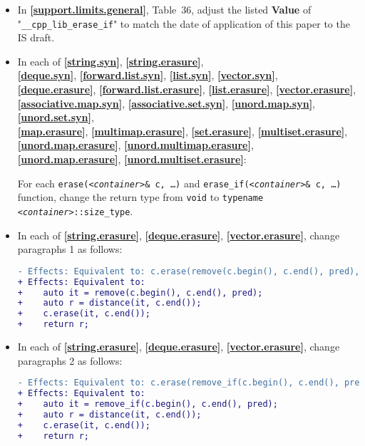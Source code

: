 \documentclass[11pt]{article}
\newcommand{\wgpaper}[1]{\href{https://wg21.link/#1}{#1}}
\newcommand{\isref}[1]{\textbf{[\wgpaper{#1}]}}
\newcommand{\cst}{\texttt{\textit{<container>}::size\_type}}
\begin{document}
\begin{itemize}
\item In \isref{support.limits.general}, Table~36, adjust the listed
  \textbf{Value} of "\texttt{\_\_cpp\_lib\_erase\_if}" to match the
  date of application of this paper to the IS draft.

\item In each of \isref{string.syn},
  \isref{string.erasure},\\ \isref{deque.syn},
  \isref{forward.list.syn}, \isref{list.syn}, \isref{vector.syn},
  \\\isref{deque.erasure}, \isref{forward.list.erasure},
  \isref{list.erasure}, \isref{vector.erasure},\\
  \isref{associative.map.syn}, \isref{associative.set.syn},
  \isref{unord.map.syn}, \isref{unord.set.syn},\\\isref{map.erasure},
  \isref{multimap.erasure}, \isref{set.erasure},
  \isref{multiset.erasure},\\ \isref{unord.map.erasure},
  \isref{unord.multimap.erasure},\\ \isref{unord.map.erasure},
  \isref{unord.multiset.erasure}:
  
For each \texttt{erase(\textit{<container>}\& c, \ldots)} and
\texttt{erase\_if(\textit{<container>}\& c, \ldots)} function, change
the return type from \texttt{void} to \texttt{typename \cst}.

\item In each of \isref{string.erasure}, \isref{deque.erasure},
  \isref{vector.erasure}, change paragraphs 1 as follows:
\begin{lstlisting}[language=diff]
- Effects: Equivalent to: c.erase(remove(c.begin(), c.end(), pred), c.end());
+ Effects: Equivalent to:
+    auto it = remove(c.begin(), c.end(), pred);
+    auto r = distance(it, c.end());
+    c.erase(it, c.end());
+    return r;
\end{lstlisting}

\item In each of \isref{string.erasure}, \isref{deque.erasure},
  \isref{vector.erasure}, change paragraphs 2 as follows:
\begin{lstlisting}[language=diff]
- Effects: Equivalent to: c.erase(remove_if(c.begin(), c.end(), pred), c.end());
+ Effects: Equivalent to:
+    auto it = remove_if(c.begin(), c.end(), pred);
+    auto r = distance(it, c.end());
+    c.erase(it, c.end());
+    return r;
\end{lstlisting}


\end{itemize}
\end{document}
